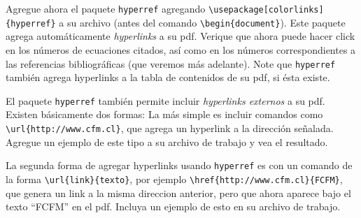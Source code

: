 \documentclass[11pt]{exam}
\begin{document}
\begin{questions}


\item Agregue ahora el paquete \texttt{hyperref} agregando 
\verb|\usepackage[colorlinks]{hyperref}| a su archivo (antes del comando \verb|\begin{document}|). Este paquete agrega automáticamente \textit{hyperlinks} a su pdf. Verique que ahora puede hacer click en los números de ecuaciones citados, así como en los números correspondientes a las referencias bibliográficas (que veremos más adelante). Note que \texttt{hyperref} también agrega hyperlinks a la tabla de contenidos de su pdf, si ésta existe.

\item El paquete \texttt{hyperref} también permite incluir \textit{hyperlinks externos} a su pdf. Existen básicamente dos formas: La más simple es incluir comandos como \verb|\url{http://www.cfm.cl}|, que agrega un hyperlink a la dirección señalada. Agregue un ejemplo de este tipo a su archivo de trabajo y vea el resultado.

\item La segunda forma de agregar hyperlinks usando \texttt{hyperref} es con un comando de la forma \verb|\url{link}{texto}|, por ejemplo \verb|\href{http://www.cfm.cl}{FCFM}|, que genera un link a la misma direccion anterior, pero que ahora aparece bajo el texto ``FCFM'' en el pdf. Incluya un ejemplo de esto en su archivo de trabajo.




\end{questions}
\end{document}
